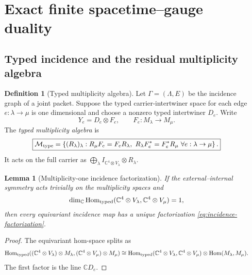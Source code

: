 \documentclass[11pt]{article}
\newtheorem{lemma}[theorem]{Lemma}
\theoremstyle{definition}
\newtheorem{definition}[theorem]{Definition}
\theoremstyle{remark}
\newcommand{\C}{\mathbb C}
\newcommand{\Hom}{\operatorname{Hom}}
\newcommand{\M}{\mathcal M}
\begin{document}
\section{Exact finite spacetime--gauge duality}
\label{sec:finite-duality}

\subsection{Typed incidence and the residual multiplicity algebra}

\begin{definition}[Typed multiplicity algebra]
\label{def:typed-multiplicity}
Let $\Gamma=(\Lambda,E)$ be the incidence graph of a joint packet.  Suppose
the typed carrier-intertwiner space for each edge $e:\lambda\to\mu$ is one
dimensional and choose a nonzero typed intertwiner $D_e$.  Write
\begin{equation}
Y_e=D_e\otimes F_e,
\qquad
F_e:M_\lambda\to M_\mu.
\label{eq:incidence-factorization}
\end{equation}
The \emph{typed multiplicity algebra} is
\begin{equation}
\boxed{
\M_{\rm type}
=
\left\{
(R_\lambda)_\lambda:
R_\mu F_e=F_eR_\lambda,\ 
R_\lambda F_e^*=F_e^*R_\mu
\ \forall e:\lambda\to\mu
\right\}.}
\label{eq:typed-multiplicity}
\end{equation}
It acts on the full carrier as
$\bigoplus_\lambda I_{\C^4\otimes V_\lambda}\otimes R_\lambda$.
\end{definition}

\begin{lemma}[Multiplicity-one incidence factorization]
\label{lem:multiplicity-factorization}
If the external--internal symmetry acts trivially on the multiplicity spaces
and
\[
\dim_\C
\Hom_{\rm typed}
(\C^4\otimes V_\lambda,\C^4\otimes V_\mu)=1,
\]
then every equivariant incidence map has a unique factorization
\eqref{eq:incidence-factorization}.
\end{lemma}

\begin{proof}
The equivariant hom-space splits as
\[
\Hom_{\rm typed}
((\C^4\otimes V_\lambda)\otimes M_\lambda,
(\C^4\otimes V_\mu)\otimes M_\mu)
\cong
\Hom_{\rm typed}(\C^4\otimes V_\lambda,\C^4\otimes V_\mu)
\otimes
\Hom(M_\lambda,M_\mu).
\]
The first factor is the line $\C D_e$.
\end{proof}
\end{document}
